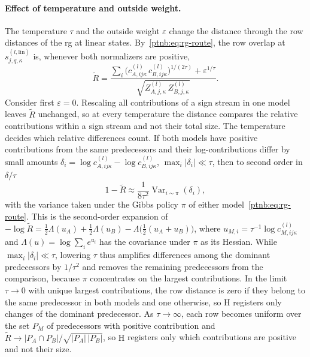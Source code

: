 \paragraph{Effect of temperature and outside weight.}
The temperature $\tau$ and the outside weight $\varepsilon$ change the distance through the row distances of the \ac{rg} at linear states. By~\eqref{ptnb:eq:rg-route}, the row overlap at $s^{(l,\mathrm{lin})}_{j,q,\kappa}$ is, whenever both normalizers are positive,
\begin{equation}\label{ptnb:eq:rg-row-overlap}
 \widetilde R
 =\frac{\sum_i\bigl(c^{(l)}_{A,ij\kappa}\,c^{(l)}_{B,ij\kappa}\bigr)^{1/(2\tau)}+\varepsilon^{1/\tau}}
 {\sqrt{Z^{(l)}_{A,j,\kappa}\,Z^{(l)}_{B,j,\kappa}}}.
\end{equation}
Consider first $\varepsilon=0$. Rescaling all contributions of a sign stream in one model leaves $\widetilde R$ unchanged, so at every temperature the distance compares the relative contributions within a sign stream and not their total size. The temperature decides which relative differences count. If both models have positive contributions from the same predecessors and their log-contributions differ by small amounts $\delta_i=\log c^{(l)}_{A,ij\kappa}-\log c^{(l)}_{B,ij\kappa}$, $\max_i|\delta_i|\ll\tau$, then to second order in $\delta/\tau$
\begin{equation}\label{ptnb:eq:rg-row-local}
 1-\widetilde R\approx\frac{1}{8\tau^2}\operatorname{Var}_{i\sim\pi}(\delta_i),
\end{equation}
with the variance taken under the Gibbs policy $\pi$ of either model~\eqref{ptnb:eq:rg-route}. This is the second-order expansion of $-\log\widetilde R=\tfrac12\Lambda(u_A)+\tfrac12\Lambda(u_B)-\Lambda\bigl(\tfrac12(u_A+u_B)\bigr)$, where $u_{M,i}=\tau^{-1}\log c^{(l)}_{M,ij\kappa}$ and $\Lambda(u)=\log\sum_ie^{u_i}$ has the covariance under $\pi$ as its Hessian. While $\max_i|\delta_i|\ll\tau$, lowering $\tau$ thus amplifies differences among the dominant predecessors by $1/\tau^2$ and removes the remaining predecessors from the comparison, because $\pi$ concentrates on the largest contributions. In the limit $\tau\to0$ with unique largest contributions, the row distance is zero if they belong to the same predecessor in both models and one otherwise, so $\mathrm H$ registers only changes of the dominant predecessor. As $\tau\to\infty$, each row becomes uniform over the set $P_M$ of predecessors with positive contribution and $\widetilde R\to|P_A\cap P_B|/\sqrt{|P_A|\,|P_B|}$, so $\mathrm H$ registers only which contributions are positive and not their size.

